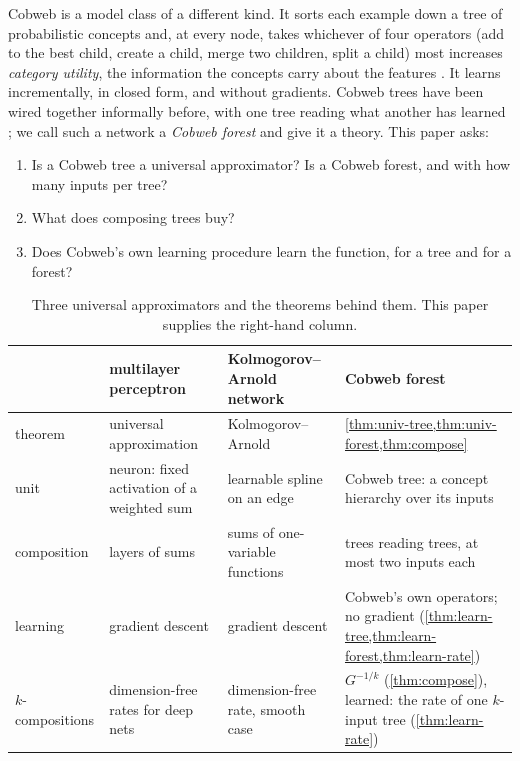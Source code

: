 \documentclass[11pt]{article}
\theoremstyle{definition}
\theoremstyle{remark}
\begin{document}
Cobweb \citep{fisher1987} is a model class of a different kind.  It sorts each example
down a tree of probabilistic concepts and, at every node, takes whichever of four
operators (add to the best child, create a child, merge two children, split a child) most
increases \emph{category utility}, the information the concepts carry about the features
\citep{corter1992,maclellan2026rational}.  It learns incrementally, in closed form, and
without gradients.  Cobweb trees have been wired together informally before, with one
tree reading what another has learned \citep{maclellan2021conv,singaravadivelan2026trellis};
we call such a network a \emph{Cobweb forest} and give it a theory.  This paper asks:
\begin{enumerate}[label=\textbf{Q\arabic*.},leftmargin=*,noitemsep]
\item Is a Cobweb tree a universal approximator?  Is a Cobweb forest, and with how many
  inputs per tree?
\item What does composing trees buy?
\item Does Cobweb's own learning procedure learn the function, for a tree and for a forest?
\end{enumerate}

\begin{table}[t]
\centering\small
\begin{tabular}{@{}p{2.6cm}p{4.0cm}p{4.0cm}p{4.4cm}@{}}\toprule
 & multilayer perceptron & Kolmogorov--Arnold network & Cobweb forest\\\midrule
theorem & universal approximation \citep{cybenko1989,hornik1989} & Kolmogorov--Arnold \citep{kolmogorov1957} & \cref{thm:univ-tree,thm:univ-forest,thm:compose}\\
unit & neuron: fixed activation of a weighted sum & learnable spline on an edge & Cobweb tree: a concept hierarchy over its inputs\\
composition & layers of sums & sums of one-variable functions & trees reading trees, at most two inputs each\\
learning & gradient descent & gradient descent & Cobweb's own operators; no gradient (\cref{thm:learn-tree,thm:learn-forest,thm:learn-rate})\\
$k$-compositions & dimension-free rates for deep nets \citep{poggio2017} & dimension-free rate, smooth case \citep{liu2024kan} & $G^{-1/k}$ (\cref{thm:compose}), learned: the rate of one $k$-input tree (\cref{thm:learn-rate})\\
\bottomrule
\end{tabular}
\caption{Three universal approximators and the theorems behind them.  This paper supplies
the right-hand column.}
\label{tab:three}
\end{table}
\end{document}
